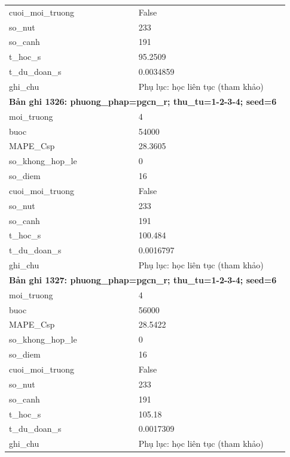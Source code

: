 \begin{longtable}{p{0.43\linewidth}p{0.50\linewidth}}
cuoi\_\allowbreak moi\_\allowbreak truong & False \\
so\_\allowbreak nut & 233 \\
so\_\allowbreak canh & 191 \\
t\_\allowbreak hoc\_\allowbreak s & 95.2509 \\
t\_\allowbreak du\_\allowbreak doan\_\allowbreak s & 0.0034859 \\
ghi\_\allowbreak chu & Phụ lục: học liên tục (tham khảo) \\
\midrule
\multicolumn{2}{p{0.95\linewidth}}{\textbf{Bản ghi 1326: phuong\_phap=pgcn\_r; thu\_tu=1-2-3-4; seed=6}} \\
moi\_\allowbreak truong & 4 \\
buoc & 54000 \\
MAPE\_\allowbreak Csp & 28.3605 \\
so\_\allowbreak khong\_\allowbreak hop\_\allowbreak le & 0 \\
so\_\allowbreak diem & 16 \\
cuoi\_\allowbreak moi\_\allowbreak truong & False \\
so\_\allowbreak nut & 233 \\
so\_\allowbreak canh & 191 \\
t\_\allowbreak hoc\_\allowbreak s & 100.484 \\
t\_\allowbreak du\_\allowbreak doan\_\allowbreak s & 0.0016797 \\
ghi\_\allowbreak chu & Phụ lục: học liên tục (tham khảo) \\
\midrule
\multicolumn{2}{p{0.95\linewidth}}{\textbf{Bản ghi 1327: phuong\_phap=pgcn\_r; thu\_tu=1-2-3-4; seed=6}} \\
moi\_\allowbreak truong & 4 \\
buoc & 56000 \\
MAPE\_\allowbreak Csp & 28.5422 \\
so\_\allowbreak khong\_\allowbreak hop\_\allowbreak le & 0 \\
so\_\allowbreak diem & 16 \\
cuoi\_\allowbreak moi\_\allowbreak truong & False \\
so\_\allowbreak nut & 233 \\
so\_\allowbreak canh & 191 \\
t\_\allowbreak hoc\_\allowbreak s & 105.18 \\
t\_\allowbreak du\_\allowbreak doan\_\allowbreak s & 0.0017309 \\
ghi\_\allowbreak chu & Phụ lục: học liên tục (tham khảo) \\

\end{longtable}

